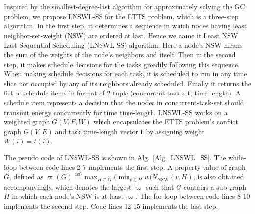 \documentclass[journal,10pt]{IEEEtran}
\begin{document}
Inspired by the smallest-degree-last algorithm \cite{Marathe1995} for approximately solving the GC problem, we propose LNSWL-SS for the ETTS problem, which is a three-step algorithm. In the first step, it determines a sequence in which nodes having least neighbor-set-weight (NSW) are ordered at last. Hence we name it Least NSW Last Sequential Scheduling (LNSWL-SS) algorithm. Here a node's NSW means the sum of the weights of the node's neighbors and itself. Then in the second step, it makes schedule decisions for the tasks greedily following this sequence. When making schedule decisions for each task, it is scheduled to run in any time slice not occupied by any of its neighbors already scheduled. Finally it returns the list of schedule items in format of 2-tuple (concurrent-task-set, time-length). A schedule item represents a decision that the nodes in concurrent-task-set should transmit energy concurrently for time time-length. LNSWL-SS works on a weighted graph $G(V,E,W)$ which encapsulates the ETTS problem's conflict graph $G(V,E)$ and task time-length vector \textbf{t} by assigning weight $W(i){=}t(i)$.

The pseudo code of LNSWL-SS is shown in Alg.~\ref{Alg_LNSWL_SS}. The while-loop between code lines 2-7 implements the first step. A property value of graph $G$, defined as $\varpi(G){\mathop{=}\limits^{\text{def}}}\max_{H{\subseteq}G}(\min_{v{\in}H}w(N_\text{NSW}(v,H)$, is also obtained accompanyingly, which denotes the largest $\varpi$ such that $G$ contains a sub-graph $H$ in which each node's NSW is at least $\varpi$. The for-loop between code lines 8-10 implements the second step. Code lines 12-15 implements the last step.
\end{document}
